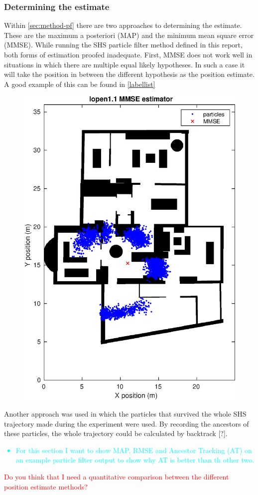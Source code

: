 \subsubsection{Determining the estimate}
Within \cref{sec:method-pf} there are two approaches to determining the estimate. These are the maximum a posteriori (MAP) and the minimum mean square error (MMSE). While running the SHS particle filter method defined in this report, both forms of estimation proofed inadequate.
First, MMSE does not work well in situations in which there are multiple equal likely hypotheses. In such a case it will take the position in between the different hypothesis as the position estimate. A good example of this can be found in \cref{labellist}
\begin{figure}
	\centering
	\includegraphics[width=0.5\linewidth]{images/20201108_1751_lopen1_1_MMSE_estimator}
	\caption{}
	\label{fig:lopen_11_mmse_estimator}
\end{figure}


Another approach was used in which the particles that survived the whole SHS trajectory made during the experiment were used. By recording the ancestors of these particles, the whole trajectory could be calculated by backtrack [\qn ?].

\textcolor{cyan}{
	\begin{itemize}
		\item For this section I want to show MAP, RMSE and Ancestor Tracking (AT) on an example particle filter output to show why AT is better than th other two.
\end{itemize}}

\textcolor{red}{Do you think that I need a quantitative comparison between the different position estimate methods?}

